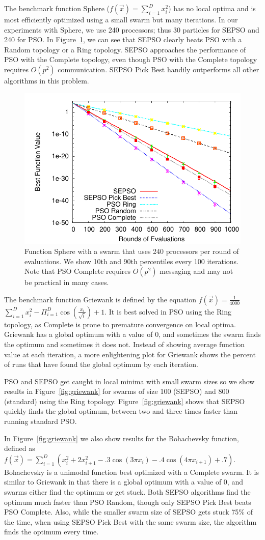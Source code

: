 \documentclass{llncs}
\newcommand{\fig}[1]{Figure~\ref{fig:#1}}
\begin{document}
The benchmark function Sphere ($f(\Vec{x}) = \sum_{i=1}^D x_i^2$) has no local
optima and is most efficiently optimized using a small swarm but many
iterations.  In our experiments with Sphere, we use 240 processors; thus 30
particles for SEPSO and 240 for PSO.  In \fig{sphere}, we can see that SEPSO
clearly beats PSO with a Random topology or a Ring topology.  SEPSO approaches
the performance of PSO with the Complete topology, even though PSO with the
Complete topology requires $O(p^2)$ communication.  SEPSO Pick Best handily
outperforms all other algorithms in this problem.

\begin{figure}
  \centering
  \includegraphics[width=.45\columnwidth]{sphere}
  \caption{Function Sphere with a swarm that uses 240 processors per round of
  evaluations.  We show 10th and 90th percentiles every 100 iterations.  Note
  that PSO Complete requires $O(p^2)$ messaging and may not be practical in
  many cases.}
  \label{fig:sphere}
\end{figure}

The benchmark function Griewank is defined by the equation $f(\Vec{x}) =
\frac{1}{4000}$ $\sum_{i=1}^D x_i^2 - \Pi_{i=1}^D
\cos\left(\frac{x_i}{\sqrt{i}} \right) + 1$.  It is best solved in PSO using
the Ring topology, as Complete is prone to premature convergence on local
optima.  Griewank has a global optimum with a value of 0, and sometimes the
swarm finds the optimum and sometimes it does not.  Instead of showing average
function value at each iteration, a more enlightening plot for Griewank shows
the percent of runs that have found the global optimum by each iteration.

PSO and SEPSO get caught in local minima with small swarm sizes so we show
results in \fig{griewank} for swarms of size 100 (SEPSO) and 800 (standard)
using the Ring topology. \fig{griewank} shows that SEPSO quickly finds the
global optimum, between two and three times faster than running standard PSO.

In \fig{griewank} we also show results for the Bohachevsky function, defined as
$f(\Vec{x}) = \sum_{i=1}^D(x_i^2+2x_{i+1}^2-.3\cos(3\pi x_i)-.4\cos(4\pi
x_{i+1})+.7)$.  Bohachevsky is a unimodal function best optimized with a
Complete swarm.  It is similar to Griewank in that there is a global optimum
with a value of 0, and swarms either find the optimum or get stuck.  Both SEPSO
algorithms find the optimum much faster than PSO Random, though only SEPSO Pick
Best beats PSO Complete.  Also, while the smaller swarm size of SEPSO gets
stuck 75\% of the time, when using SEPSO Pick Best with the same swarm size,
the algorithm finds the optimum every time.
\end{document}
